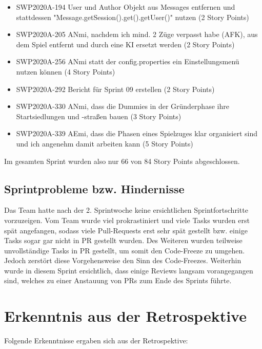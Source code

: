 \documentclass[12pt,a4paper, oneside]{article}
\begin{document}
    \begin{itemize}

        \item SWP2020A-194 User und Author Objekt aus Messages entfernen und stattdessen "Message.getSession().get().getUser()" nutzen (2 Story Points)

        \item SWP2020A-205 ANmi, nachdem ich mind. 2 Züge verpasst habe (AFK), aus dem Spiel entfernt und durch eine KI ersetzt werden (2 Story Points)

        \item SWP2020A-256 ANmi statt der config.properties ein Einstellungsmenü nutzen können (4 Story Points)

        \item SWP2020A-292 Bericht für Sprint 09 erstellen (2 Story Points)

        \item SWP2020A-330 ANmi, dass die Dummies in der Gründerphase ihre Startsiedlungen und -straßen bauen (3 Story Points)

        \item SWP2020A-339 AEmi, dass die Phasen eines Spielzuges klar organisiert sind und ich angenehm damit arbeiten kann (5 Story Points)

    \end{itemize}

    \noindent
    Im gesamten Sprint wurden also nur 66 von 84 Story Points abgeschlossen.

    \newpage

    \subsection{Sprintprobleme bzw. Hindernisse}
    Das Team hatte nach der 2. Sprintwoche keine ersichtlichen Sprintfortschritte vorzuzeigen. Vom Team wurde viel prokrastiniert und viele Tasks wurden erst spät angefangen, sodass viele Pull-Requests erst sehr spät gestellt bzw. einige Tasks sogar gar nicht in PR gestellt wurden. Des Weiteren wurden teilweise unvollständige Tasks in PR gestellt, um somit den Code-Freeze zu umgehen. Jedoch zerstört diese Vorgehensweise den Sinn des Code-Freezes.
    Weiterhin wurde in diesem Sprint ersichtlich, dass einige Reviews langsam vorangegangen sind, welches zu einer Anstauung von PRs zum Ende des Sprints führte.

    \section{Erkenntnis aus der Retrospektive}
    Folgende Erkenntnisse ergaben sich aus der Retrospektive:\\
\end{document}
